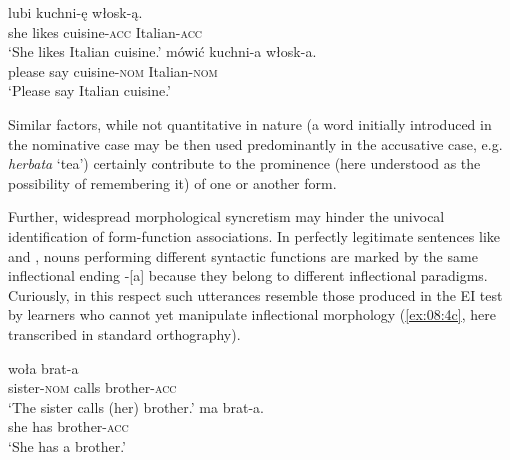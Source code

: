\ea%
    \label{ex:08:3}
    \ea
    \label{ex:08:3a}
       {lubi}   {kuchni-ę}   {włosk-ą.}\\
            she  likes  cuisine-\textsc{acc}  Italian-\textsc{acc}\\
    \glt    ‘She likes Italian cuisine.’
    \ex
    \label{ex:08:3b}
       {mówić}   {kuchni-a}   {włosk-a.}\\
            please  say  cuisine-\textsc{nom}  Italian-\textsc{nom}\\
    \glt    ‘Please say Italian cuisine.’
    \z
\z

Similar factors, while not quantitative in nature (a word initially introduced in the nominative case may be then used predominantly in the accusative case, e.g. \textit{herbata} ‘tea’) certainly contribute to the prominence (here understood as the possibility of remembering it) of one or another form. 

Further, widespread morphological syncretism may hinder the univocal identification of form-function associations. In perfectly legitimate sentences like  and  , nouns performing different syntactic functions are marked by the same inflectional ending -[a] because they belong to different inflectional paradigms. Curiously, in this respect such utterances resemble those produced in the EI test by learners who cannot yet manipulate inflectional morphology (\ref{ex:08:4c}, here transcribed in standard orthography).

\ea%
    \label{ex:08:4}
    \ea\label{ex:08:4a}
       {woła}   {brat-a} \\
            sister-\textsc{nom} calls   brother-\textsc{acc}\\
    \glt    ‘The sister calls (her) brother.’
    \ex\label{ex:08:4b}
       {ma}   {brat-a.}\\
            she  has  brother-\textsc{acc}\\
    \glt    ‘She has a brother.’
    \glt   
    \z
\z

